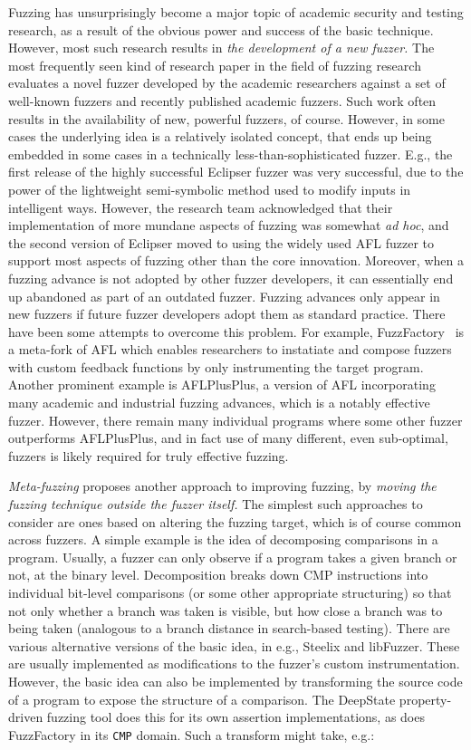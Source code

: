 Fuzzing has unsurprisingly become a major topic of academic security and 
testing research, as a result of the obvious power and success of the basic 
technique.  However, most such research results in \emph{the development of a 
new fuzzer.}  The most frequently seen kind of research paper in the field of fuzzing
research evaluates a
novel fuzzer developed by the academic researchers against a set of well-known 
fuzzers and recently published academic fuzzers.  Such work often results in 
the availability of new, powerful fuzzers, of course.  However, in some cases 
the underlying idea is a relatively isolated concept, that ends up being 
embedded in some cases in a technically less-than-sophisticated fuzzer.  E.g., 
the first release of the highly successful Eclipser fuzzer was very successful, 
due to the power of the lightweight semi-symbolic method used to modify 
inputs in intelligent ways.  However, the research team acknowledged that their 
implementation of more mundane aspects of fuzzing was somewhat \emph{ad hoc}, and the 
second version of Eclipser moved to using the widely used AFL fuzzer to support 
most aspects of fuzzing other than the core innovation.  Moreover, when a 
fuzzing advance is not adopted by other fuzzer developers, it can
essentially end up abandoned as part of an outdated fuzzer.  Fuzzing advances only appear in new fuzzers 
if future fuzzer developers adopt them as standard practice.  There have 
been some attempts to overcome this problem. For example, 
FuzzFactory~\cite{fuzzfactory} is a meta-fork of AFL which enables researchers 
to instatiate and compose fuzzers with custom feedback functions by only 
instrumenting the target program. Another prominent example is AFLPlusPlus, a 
version of AFL incorporating many academic and industrial fuzzing advances, 
which is a notably effective fuzzer.  However, there remain many individual 
programs where some other fuzzer outperforms AFLPlusPlus, and in fact use of 
many different, even sub-optimal, fuzzers is likely required for truly 
effective fuzzing.

\emph{Meta-fuzzing} proposes another approach to improving fuzzing, by 
\emph{moving the fuzzing technique outside the fuzzer itself.}  The simplest 
such approaches to consider are ones based on altering the fuzzing target, 
which is of course common across fuzzers.  A simple example is the idea of 
decomposing comparisons in a program.  Usually, a fuzzer can only observe if a 
program takes a given branch or not, at the binary level.  Decomposition breaks 
down CMP instructions into individual bit-level comparisons (or some other 
appropriate structuring) so that not only whether a branch was taken is 
visible, but how close a branch was to being taken (analogous to a branch 
distance in search-based testing).  There are various alternative versions of 
the basic idea, in e.g., Steelix and libFuzzer.  These are usually implemented 
as modifications to the fuzzer's custom instrumentation.  However, the basic 
idea can also be implemented by transforming the source code of a program to 
expose the structure of a comparison.  The DeepState property-driven fuzzing 
tool does this for its own assertion implementations, as does FuzzFactory in 
its \texttt{CMP} domain.  Such a transform might take, e.g.:


